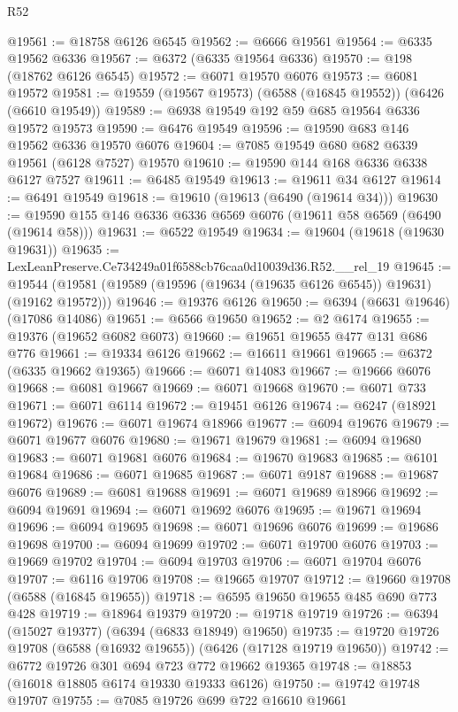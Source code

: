 \begin{lexlean}{R52}
\begin{coremodule}
@19561 := @18758 @6126 @6545
@19562 := @6666 @19561
@19564 := @6335 @19562 @6336
@19567 := @6372 (@6335 @19564 @6336)
@19570 := @198 (@18762 @6126 @6545)
@19572 := @6071 @19570 @6076
@19573 := @6081 @19572
@19581 := @19559 (@19567 @19573) (@6588 (@16845 @19552)) (@6426 (@6610 @19549))
@19589 := @6938 @19549 @192 @59 @685 @19564 @6336 @19572 @19573
@19590 := @6476 @19549
@19596 := @19590 @683 @146 @19562 @6336 @19570 @6076
@19604 := @7085 @19549 @680 @682 @6339 @19561 (@6128 @7527) @19570
@19610 := @19590 @144 @168 @6336 @6338 @6127 @7527
@19611 := @6485 @19549
@19613 := @19611 @34 @6127
@19614 := @6491 @19549
@19618 := @19610 (@19613 (@6490 (@19614 @34)))
@19630 := @19590 @155 @146 @6336 @6336 @6569 @6076 (@19611 @58 @6569 (@6490 (@19614 @58)))
@19631 := @6522 @19549
@19634 := @19604 (@19618 (@19630 @19631))
@19635 := LexLeanPreserve.Ce734249a01f6588cb76caa0d10039d36.R52.__rel_19
@19645 := @19544 (@19581 (@19589 (@19596 (@19634 (@19635 @6126 @6545)) @19631) (@19162 @19572)))
@19646 := @19376 @6126
@19650 := @6394 (@6631 @19646) (@17086 @14086)
@19651 := @6566 @19650
@19652 := @2 @6174
@19655 := @19376 (@19652 @6082 @6073)
@19660 := @19651 @19655 @477 @131 @686 @776
@19661 := @19334 @6126
@19662 := @16611 @19661
@19665 := @6372 (@6335 @19662 @19365)
@19666 := @6071 @14083
@19667 := @19666 @6076
@19668 := @6081 @19667
@19669 := @6071 @19668
@19670 := @6071 @733
@19671 := @6071 @6114
@19672 := @19451 @6126
@19674 := @6247 (@18921 @19672)
@19676 := @6071 @19674 @18966
@19677 := @6094 @19676
@19679 := @6071 @19677 @6076
@19680 := @19671 @19679
@19681 := @6094 @19680
@19683 := @6071 @19681 @6076
@19684 := @19670 @19683
@19685 := @6101 @19684
@19686 := @6071 @19685
@19687 := @6071 @9187
@19688 := @19687 @6076
@19689 := @6081 @19688
@19691 := @6071 @19689 @18966
@19692 := @6094 @19691
@19694 := @6071 @19692 @6076
@19695 := @19671 @19694
@19696 := @6094 @19695
@19698 := @6071 @19696 @6076
@19699 := @19686 @19698
@19700 := @6094 @19699
@19702 := @6071 @19700 @6076
@19703 := @19669 @19702
@19704 := @6094 @19703
@19706 := @6071 @19704 @6076
@19707 := @6116 @19706
@19708 := @19665 @19707
@19712 := @19660 @19708 (@6588 (@16845 @19655))
@19718 := @6595 @19650 @19655 @485 @690 @773 @428
@19719 := @18964 @19379
@19720 := @19718 @19719
@19726 := @6394 (@15027 @19377) (@6394 (@6833 @18949) @19650)
@19735 := @19720 @19726 @19708 (@6588 (@16932 @19655)) (@6426 (@17128 @19719 @19650))
@19742 := @6772 @19726 @301 @694 @723 @772 @19662 @19365
@19748 := @18853 (@16018 @18805 @6174 @19330 @19333 @6126)
@19750 := @19742 @19748 @19707
@19755 := @7085 @19726 @699 @722 @16610 @19661

\end{coremodule}
\end{lexlean}
